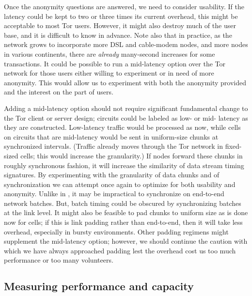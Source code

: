 \documentclass{llncs}
\begin{document}
Once the anonymity questions are answered, we need to consider usability.  If
the latency could be kept to two or three times its current overhead, this
might be acceptable to most Tor users. However, it might also destroy much of
the user base, and it is difficult to know in advance.  Note also that in
practice, as the network grows to incorporate more DSL and cable-modem nodes,
and more nodes in various continents, there are \emph{already}
many-second increases for some transactions.  It could be possible to
run a mid-latency option over the Tor network for those
users either willing to experiment or in need of more
anonymity.  This would allow us to experiment with both
the anonymity provided and the interest on the part of users.

Adding a mid-latency option should not require significant fundamental
change to the Tor client or server design; circuits could be labeled as
low- or mid- latency as they are constructed. Low-latency traffic
would be processed as now, while cells on circuits that are mid-latency
would be sent in uniform-size chunks at synchronized intervals.  (Traffic
already moves through the Tor network in fixed-sized cells; this would
increase the granularity.)  If nodes forward these chunks in roughly
synchronous  fashion, it will increase the similarity of data stream timing
signatures. By experimenting with the granularity of data chunks and
of synchronization we can attempt once again to optimize for both
usability and anonymity. Unlike in \cite{sync-batching}, it may be
impractical to synchronize on end-to-end network batches.
But, batch timing could be obscured by
synchronizing batches at the link level.
It might also be feasible to
pad chunks to uniform size as is done now for cells; if this is link
padding rather than end-to-end, then it will take less overhead,
especially in bursty environments.
Other padding regimens might supplement the
mid-latency option; however, we should continue the caution with which
we have always approached padding lest the overhead cost us too much
performance or too many volunteers.


\subsection{Measuring performance and capacity}
\label{subsec:performance}
\end{document}
